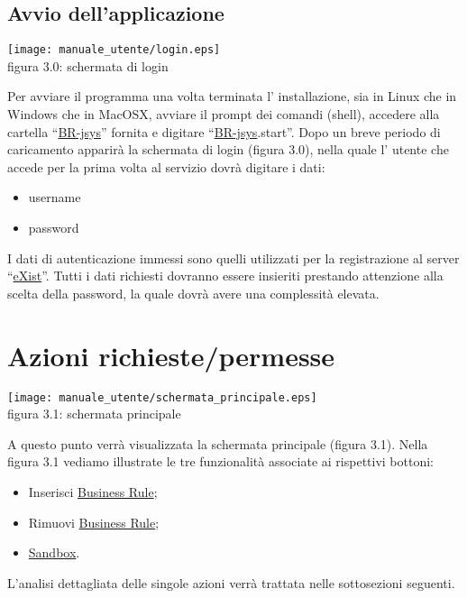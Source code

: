 \subsection{Avvio dell'applicazione}
\begin{center}
\texttt{[image: manuale\_utente/login.eps]}\\
 figura 3.0: schermata di login
\end{center}
Per avviare il programma una volta terminata l' installazione, sia in Linux che in Windows che in MacOSX, avviare il prompt dei comandi (shell), accedere alla cartella ``\underline{BR-jsys}'' fornita e digitare ``\underline{BR-jsys}.start''. Dopo un breve periodo di caricamento apparir\`a la schermata di login (figura 3.0), nella quale l' utente che accede per la prima volta al servizio dovr\`a digitare i dati: 
\begin{itemize}
\item username
\item password
\end{itemize}
I dati di autenticazione immessi sono quelli utilizzati per la registrazione al server ``\underline{eXist}''. Tutti i dati richiesti dovranno essere insieriti prestando attenzione alla scelta della password, la quale dovr\`a avere una complessit\`a elevata. 
\section{Azioni richieste/permesse}
\begin{center}
\texttt{[image: manuale\_utente/schermata\_principale.eps]}\\
 figura 3.1: schermata principale
\end{center}
A questo punto verr\`a visualizzata la schermata principale (figura 3.1).
Nella figura 3.1 vediamo illustrate le tre funzionalit\`a associate ai rispettivi bottoni:
\begin{itemize}
\item Inserisci \underline{Business Rule};
\item Rimuovi \underline{Business Rule};
\item \underline{Sandbox}.
\end{itemize}
L'analisi dettagliata delle singole azioni verr\`a trattata nelle sottosezioni seguenti.
